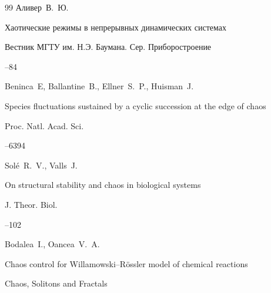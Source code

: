 \begin{thebibliography}{99}
\by Аливер~В.~Ю.

\paper Хаотические режимы в непрерывных динамических системах

\jour Вестник МГТУ им. Н.Э. Баумана. Сер. Приборостроение



--84












\by Beninca~E, Ballantine~B., Ellner~S.~P., Huisman~J. 

\paper Species fluctuations sustained by a cyclic succession at the edge of chaos

\jour Proc. Natl. Acad. Sci. 




--6394





\by Sol\'e~R.~V., Valls~J.

\paper On structural stability and chaos in biological systems

\jour J. Theor. Biol.




--102





\by Bodalea~I., Oancea~V.~A.

\paper  Chaos control for Willamowski--R\"ossler model of chemical reactions 

\jour Chaos, Solitons and Fractals


\end{thebibliography}
